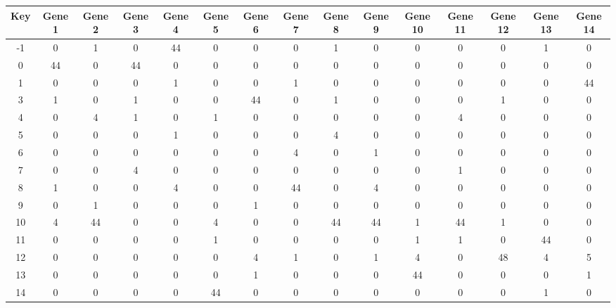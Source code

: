 \begin{tabular}{|c|c|c|c|c|c|c|c|c|c|c|c|c|c|c|}
\hline
Key & Gene 1 & Gene 2 & Gene 3 & Gene 4 & Gene 5 & Gene 6 & Gene 7 & Gene 8 & Gene 9 & Gene 10 & Gene 11 & Gene 12 & Gene 13 & Gene 14 \\
\hline
-1 & 0 & 1 & 0 & 44 & 0 & 0 & 0 & 1 & 0 & 0 & 0 & 0 & 1 & 0 \\
0 & 44 & 0 & 44 & 0 & 0 & 0 & 0 & 0 & 0 & 0 & 0 & 0 & 0 & 0 \\
1 & 0 & 0 & 0 & 1 & 0 & 0 & 1 & 0 & 0 & 0 & 0 & 0 & 0 & 44 \\
3 & 1 & 0 & 1 & 0 & 0 & 44 & 0 & 1 & 0 & 0 & 0 & 1 & 0 & 0 \\
4 & 0 & 4 & 1 & 0 & 1 & 0 & 0 & 0 & 0 & 0 & 4 & 0 & 0 & 0 \\
5 & 0 & 0 & 0 & 1 & 0 & 0 & 0 & 4 & 0 & 0 & 0 & 0 & 0 & 0 \\
6 & 0 & 0 & 0 & 0 & 0 & 0 & 4 & 0 & 1 & 0 & 0 & 0 & 0 & 0 \\
7 & 0 & 0 & 4 & 0 & 0 & 0 & 0 & 0 & 0 & 0 & 1 & 0 & 0 & 0 \\
8 & 1 & 0 & 0 & 4 & 0 & 0 & 44 & 0 & 4 & 0 & 0 & 0 & 0 & 0 \\
9 & 0 & 1 & 0 & 0 & 0 & 1 & 0 & 0 & 0 & 0 & 0 & 0 & 0 & 0 \\
10 & 4 & 44 & 0 & 0 & 4 & 0 & 0 & 44 & 44 & 1 & 44 & 1 & 0 & 0 \\
11 & 0 & 0 & 0 & 0 & 1 & 0 & 0 & 0 & 0 & 1 & 1 & 0 & 44 & 0 \\
12 & 0 & 0 & 0 & 0 & 0 & 4 & 1 & 0 & 1 & 4 & 0 & 48 & 4 & 5 \\
13 & 0 & 0 & 0 & 0 & 0 & 1 & 0 & 0 & 0 & 44 & 0 & 0 & 0 & 1 \\
14 & 0 & 0 & 0 & 0 & 44 & 0 & 0 & 0 & 0 & 0 & 0 & 0 & 1 & 0 \\
\hline
\end{tabular}